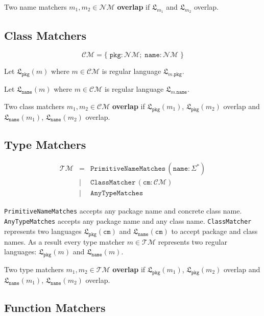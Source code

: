 \documentclass{article}
\newcommand{\lang}{\mathfrak{L}}
\begin{document}
\noindent Two name matchers $m_1, m_2 \in \mathcal{NM}$ \textbf{overlap} if $\lang_{m_1}$ and $\lang_{m_2}$ overlap.

\subsection{Class Matchers}

\[
\mathcal{CM} = \{\;\texttt{pkg} : \mathcal{NM};\; \texttt{name} : \mathcal{NM}\;\}
\]

Let $\lang_\texttt{pkg}(m)$ where $m \in \mathcal{CM}$ is regular language $\lang_{m.\texttt{pkg}}$.

Let $\lang_\texttt{name}(m)$ where $m \in \mathcal{CM}$ is regular language $\lang_{m.\texttt{name}}$.

\noindent Two class matchers $m_1, m_2 \in \mathcal{CM}$ \textbf{overlap} if $\lang_\texttt{pkg}(m_1)$, $\lang_\texttt{pkg}(m_2)$ overlap and $\lang_\texttt{name}(m_1)$, $\lang_\texttt{name}(m_2)$ overlap.

\subsection{Type Matchers}
\[
\begin{array}{rcll}
\mathcal{TM} & =    & \texttt{PrimitiveNameMatches}\,(\texttt{name} : \Sigma^*) \\
             & \mid & \texttt{ClassMatcher}\,(\texttt{cm} : \mathcal{CM}) \\
             & \mid & \texttt{AnyTypeMatches}
\end{array}
\]

\texttt{PrimitiveNameMatches} accepts any package name and concrete class name. \texttt{AnyTypeMatches} accepts any package name and any class name. \texttt{ClassMatcher} represents two languages $\lang_\texttt{pkg}(\texttt{cm})$ and $\lang_\texttt{name}(\texttt{cm})$ to accept package and class names. As a result every type matcher $m \in \mathcal{TM}$ represents two regular languages: $\lang_\texttt{pkg}(m)$ and $\lang_\texttt{name}(m)$.

Two type matchers $m_1, m_2 \in \mathcal{TM}$ \textbf{overlap} if $\lang_\texttt{pkg}(m_1)$, $\lang_\texttt{pkg}(m_2)$ overlap and $\lang_\texttt{name}(m_1)$, $\lang_\texttt{name}(m_2)$ overlap.

\subsection{Function Matchers}
\end{document}
